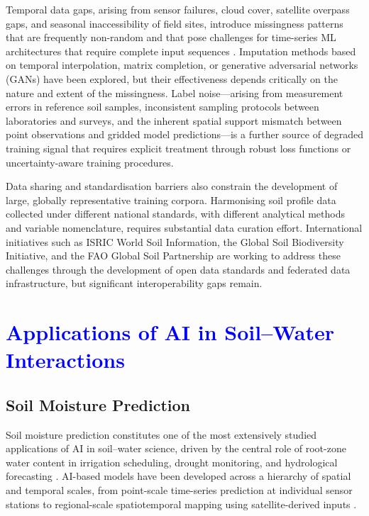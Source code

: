 \documentclass[land,article,submit,pdftex,moreauthors]{Definitions/mdpi}
\numberwithin{equation}{section}
\begin{document}
Temporal data gaps, arising from sensor failures, cloud cover, satellite overpass gaps, and seasonal inaccessibility of field sites, introduce missingness patterns that are frequently non-random and that pose challenges for time-series ML architectures that require complete input sequences \citep{gruber2020}. Imputation methods based on temporal interpolation, matrix completion, or generative adversarial networks (GANs) have been explored, but their effectiveness depends critically on the nature and extent of the missingness. Label noise---arising from measurement errors in reference soil samples, inconsistent sampling protocols between laboratories and surveys, and the inherent spatial support mismatch between point observations and gridded model predictions---is a further source of degraded training signal that requires explicit treatment through robust loss functions or uncertainty-aware training procedures.

Data sharing and standardisation barriers also constrain the development of large, globally representative training corpora. Harmonising soil profile data collected under different national standards, with different analytical methods and variable nomenclature, requires substantial data curation effort. International initiatives such as ISRIC World Soil Information, the Global Soil Biodiversity Initiative, and the FAO Global Soil Partnership are working to address these challenges through the development of open data standards and federated data infrastructure, but significant interoperability gaps remain.

\section{\textcolor{blue}{Applications of AI in Soil--Water Interactions}}

\subsection{Soil Moisture Prediction}

Soil moisture prediction constitutes one of the most extensively studied applications of AI in soil--water science, driven by the central role of root-zone water content in irrigation scheduling, drought monitoring, and hydrological forecasting \cite{hess2024}. AI-based models have been developed across a hierarchy of spatial and temporal scales, from point-scale time-series prediction at individual sensor stations to regional-scale spatiotemporal mapping using satellite-derived inputs \citep{fang2019deep}.
\end{document}

